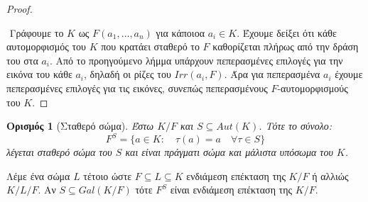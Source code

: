 \documentclass[oneside,a4paper]{article}
\newtheorem*{defn}{Ορισμός}
\begin{document}
\begin{proof} $ $
	
	$ $\newline
	Γράφουμε το $K$ ως $F(a_1 , \ldots, a_n)$ για κάποιοα $a_i \in K$. Έχουμε δείξει ότι κάθε αυτομορφισμός του $K$ που κρατάει σταθερό το $F$ καθορίζεται πλήρως από την δράση του στα $a_i$. Από το προηγούμενο λήμμα υπάρχουν πεπερασμένες επιλογές για την εικόνα του κάθε $a_i$, δηλαδή οι ρίζες του $Irr(a_i, F)$. Άρα για πεπερασμένα $a_i$ έχουμε πεπερασμένες επιλογές για τις εικόνες, συνεπώς πεπερασμένους $F$-αυτομορφισμούς του $K$.
\end{proof}
\vspace{0.1cm}
\begin{defn}[Σταθερό σώμα]
	Έστω $K/F$ και $S \subseteq Aut(K)$. Τότε το σύνολο:
	$$F^S = \{a \in K: \quad \tau(a) = a \quad\forall \tau \in S\}$$
	λέγεται σταθερό σώμα του $S$ και είναι πράγματι σώμα και μάλιστα υπόσωμα του $K$.
\end{defn}
\vspace{0.1cm}
Λέμε ένα σώμα $L$ τέτοιο ώστε $F \subseteq L \subseteq K$ ενδιάμεση επέκταση της $K/F$ ή αλλιώς $K/L/F$. Αν $S\subseteq Gal(K/F)$ τότε $F^S$ είναι ενδιάμεση επέκταση της $K/F$.
\end{document}
